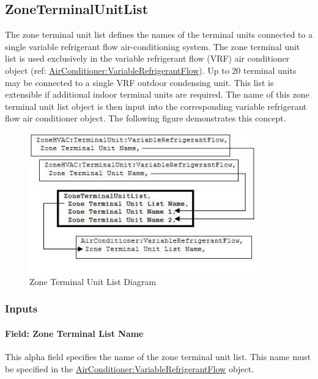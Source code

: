 \subsection{ZoneTerminalUnitList}\label{zoneterminalunitlist}

The zone terminal unit list defines the names of the terminal units connected to a single variable refrigerant flow air-conditioning system. The zone terminal unit list is used exclusively in the variable refrigerant flow (VRF) air conditioner object (ref: \hyperref[airconditionervariablerefrigerantflow]{AirConditioner:VariableRefrigerantFlow}). Up to 20 terminal units may be connected to a single VRF outdoor condensing unit. This list is extensible if additional indoor terminal units are required. The name of this zone terminal unit list object is then input into the corresponding variable refrigerant flow air conditioner object. The following figure demonstrates this concept.

\begin{figure}[hbtp] %
\centering
\includegraphics[width=0.9\textwidth, height=0.9\textheight, keepaspectratio=true]{media/image313.png}
\caption{Zone Terminal Unit List Diagram \protect \label{fig:zone-terminal-unit-list-diagram}}
\end{figure}
\subsubsection{Inputs}\label{inputs-2-044}

\paragraph{Field: Zone Terminal List Name}\label{field-zone-terminal-list-name}

This alpha field specifies the name of the zone terminal unit list. This name must be specified in the \hyperref[airconditionervariablerefrigerantflow]{AirConditioner:VariableRefrigerantFlow} object.

